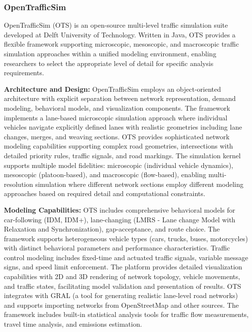\subsubsection{OpenTrafficSim}

OpenTrafficSim (OTS) is an open-source multi-level traffic simulation suite developed at Delft University of Technology. Written in Java, OTS provides a flexible framework supporting microscopic, mesoscopic, and macroscopic traffic simulation approaches within a unified modeling environment, enabling researchers to select the appropriate level of detail for specific analysis requirements.

\textbf{Architecture and Design:} OpenTrafficSim employs an object-oriented architecture with explicit separation between network representation, demand modeling, behavioral models, and visualization components. The framework implements a lane-based microscopic simulation approach where individual vehicles navigate explicitly defined lanes with realistic geometries including lane changes, merges, and weaving sections. OTS provides sophisticated network modeling capabilities supporting complex road geometries, intersections with detailed priority rules, traffic signals, and road markings. The simulation kernel supports multiple model fidelities: microscopic (individual vehicle dynamics), mesoscopic (platoon-based), and macroscopic (flow-based), enabling multi-resolution simulation where different network sections employ different modeling approaches based on required detail and computational constraints.

\textbf{Modeling Capabilities:} OTS includes comprehensive behavioral models for car-following (IDM, IDM+), lane-changing (LMRS - Lane change Model with Relaxation and Synchronization), gap-acceptance, and route choice. The framework supports heterogeneous vehicle types (cars, trucks, buses, motorcycles) with distinct behavioral parameters and performance characteristics. Traffic control modeling includes fixed-time and actuated traffic signals, variable message signs, and speed limit enforcement. The platform provides detailed visualization capabilities with 2D and 3D rendering of network topology, vehicle movements, and traffic states, facilitating model validation and presentation of results. OTS integrates with GRAL (a tool for generating realistic lane-level road networks) and supports importing networks from OpenStreetMap and other sources. The framework includes built-in statistical analysis tools for traffic flow measurements, travel time analysis, and emissions estimation.

